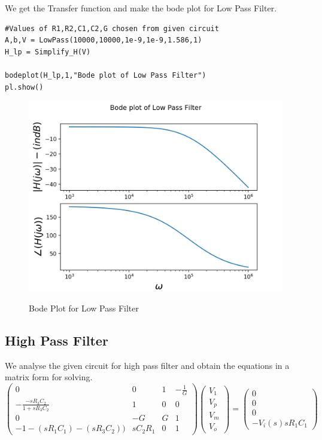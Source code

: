 \documentclass[11pt, a4paper]{article}
\begin{document}
We get the Transfer function and make the bode plot for Low Pass Filter.
\begin{verbatim}
#Values of R1,R2,C1,C2,G chosen from given circuit
A,b,V = LowPass(10000,10000,1e-9,1e-9,1.586,1)
H_lp = Simplify_H(V)

bodeplot(H_lp,1,"Bode plot of Low Pass Filter")
pl.show()

\end{verbatim}

\begin{figure}[H]
   	\centering
   	\includegraphics[scale=0.8]{bode_lpf.png}
   	\label{fig:bode_lpf}
   	\caption{Bode Plot for Low Pass Filter}
\end{figure}

\subsection{High Pass Filter}
{
We analyse the given circuit for high pass filter and obtain the equations in a matrix form for solving.
}
\[\begin{pmatrix} 0 & 0 & 1 & -\frac{1}{G} 
\\ -\frac{-sR_3C_2}{1+sR_3C_2} & 1 & 0 & 0 
\\ 0 & -G & G & 1 
\\ -1-(sR_1C_1)-(sR_3C_2)) & sC_2R_1 & 0 & 1 
\end{pmatrix}
\begin{pmatrix} V_1 \\ V_p \\ V_m \\ V_o \end{pmatrix} 
= 
\begin{pmatrix} 0 \\ 0 \\ 0 \\ -V_i(s)sR_1C_1 \end{pmatrix}\]
\end{document}
